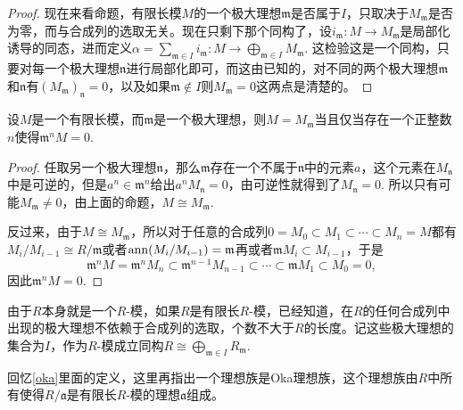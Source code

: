 \begin{proof}
	现在来看命题，有限长模$M$的一个极大理想$\mathfrak{m}$是否属于$I$，只取决于$M_\mathfrak{m}$是否为零，而与合成列的选取无关。现在只剩下那个同构了，设$i_\mathfrak{m}:M\to M_{\mathfrak{m}}$是局部化诱导的同态，进而定义$\alpha=\sum_{\mathfrak{m}\in I}i_{\mathfrak{m}}:M\to \bigoplus_{\mathfrak{m}\in I} M_{\mathfrak{m}}$. 这检验这是一个同构，只要对每一个极大理想$\mathfrak{n}$进行局部化即可，而这由已知的，对不同的两个极大理想$\mathfrak{m}$和$\mathfrak{n}$有$(M_\mathfrak{m})_\mathfrak{n}=0$，以及如果$\mathfrak{m}\not\in I$则$M_\mathfrak{m}=0$这两点是清楚的。
\end{proof}

\begin{pro}
设$M$是一个有限长模，而$\mathfrak{m}$是一个极大理想，则$M=M_{\mathfrak{m}}$当且仅当存在一个正整数$n$使得$\mathfrak{m}^nM=0$.
\end{pro}

\begin{proof}
	任取另一个极大理想$\mathfrak{n}$，那么$\mathfrak{m}$存在一个不属于$\mathfrak{n}$中的元素$a$，这个元素在$M_\mathfrak{n}$中是可逆的，但是$a^n\in \mathfrak{m}^n$给出$a^nM_\mathfrak{n}=0$，由可逆性就得到了$M_\mathfrak{n}=0$. 所以只有可能$M_\mathfrak{m}\neq 0$，由上面的命题，$M\cong M_\mathfrak{m}$.

	反过来，由于$M\cong M_\mathfrak{m}$，所以对于任意的合成列$0=M_0\subset M_1\subset \cdots\subset M_n=M$都有$M_i/M_{i-1}\cong R/\mathfrak{m}$或者$\operatorname{ann}(M_i/M_{i-1})=\mathfrak{m}$再或者$\mathfrak{m}M_{i}\subset M_{i-1}$，于是
	\[
	\mathfrak{m}^nM=\mathfrak{m}^nM_{n}\subset \mathfrak{m}^{n-1}M_{n-1}\subset \cdots \subset \mathfrak{m}M_1\subset M_0=0,
	\]
	因此$\mathfrak{m}^nM=0$.
\end{proof}

\para 由于$R$本身就是一个$R$-模，如果$R$是有限长$R$-模，已经知道，在$R$的任何合成列中出现的极大理想不依赖于合成列的选取，个数不大于$R$的长度。记这些极大理想的集合为$I$，作为$R$-模成立同构$R\cong\bigoplus_{\mathfrak{m}\in I}R_\mathfrak{m}$.

\begin{lem}
回忆\eqref{oka}里面的定义，这里再指出一个理想族是Oka理想族，这个理想族由$R$中所有使得$R/\mathfrak{a}$是有限长$R$-模的理想$\mathfrak{a}$组成。
\end{lem}


